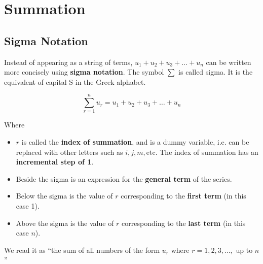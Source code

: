 \documentclass[11pt,a4paper]{book}
\begin{document}
\begin{example}
\begin{enumerate}[label=(\alph*)]
\end{enumerate}

\end{example}

\newpage

\chapter{Summation}

\section{Sigma Notation}

Instead of appearing as a string of terms, $u_{1}+u_{2}+u_{3}+\ldots+u_{n}$ can be written more concisely using \textbf{sigma notation}.
 The symbol $\sum$ is called sigma. It is the equivalent of capital
S in the Greek alphabet.

\begin{tcolorbox}[colback=blue!5, colframe=black,boxrule=.4pt, sharpish corners]

\[
\sum_{r=1}^{n}u_{r}=u_{1}+u_{2}+u_{3}+\ldots+u_{n}
\]

Where

\begin{itemize}

\item  $r$ is called the \textbf{index of summation}, and is a dummy
variable, i.e. can be replaced with other letters such as $i,j,m,\text{etc.}$
The index of summation has an \textbf{incremental step of 1}.

\item  Beside the sigma is an expression for the \textbf{general
term} of the series.

\item  Below the sigma is the value of $r$ corresponding to the
\textbf{first term} (in this case 1).

\item  Above the sigma is the value of $r$ corresponding to the
\textbf{last term }(in this case $n$).

\end{itemize}

We read it as ``the sum of all numbers of the form $u_{r}$ where
$r=1,2,3,\ldots,$ up to $n$''
\end{tcolorbox}
\end{document}
